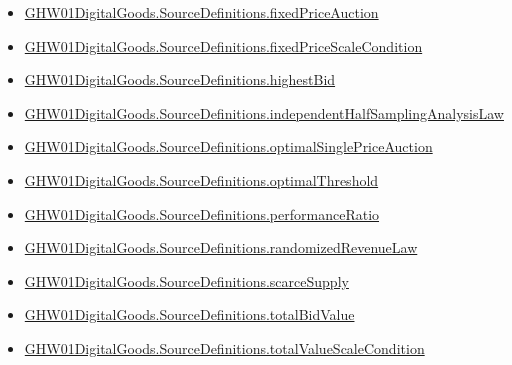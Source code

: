 \documentclass[10pt]{article}
\begin{document}
\begin{itemize}[leftmargin=1.2em]
\begin{itemize}[leftmargin=1.2em]
\item \hyperlink{paper-prerequisite-85852b14bf51130e}{GHW01\allowbreak{}Digital\allowbreak{}Goods.\allowbreak{}Source\allowbreak{}Definitions.\allowbreak{}fixed\allowbreak{}Price\allowbreak{}Auction}
\item \hyperlink{paper-prerequisite-cac1ad0b007c0092}{GHW01\allowbreak{}Digital\allowbreak{}Goods.\allowbreak{}Source\allowbreak{}Definitions.\allowbreak{}fixed\allowbreak{}Price\allowbreak{}Scale\allowbreak{}Condition}
\item \hyperlink{paper-prerequisite-702e37b431515e39}{GHW01\allowbreak{}Digital\allowbreak{}Goods.\allowbreak{}Source\allowbreak{}Definitions.\allowbreak{}highest\allowbreak{}Bid}
\item \hyperlink{paper-prerequisite-e6805388180d767a}{GHW01\allowbreak{}Digital\allowbreak{}Goods.\allowbreak{}Source\allowbreak{}Definitions.\allowbreak{}independent\allowbreak{}Half\allowbreak{}Sampling\allowbreak{}Analysis\allowbreak{}Law}
\item \hyperlink{paper-prerequisite-bde594f238fcbce3}{GHW01\allowbreak{}Digital\allowbreak{}Goods.\allowbreak{}Source\allowbreak{}Definitions.\allowbreak{}optimal\allowbreak{}Single\allowbreak{}Price\allowbreak{}Auction}
\item \hyperlink{paper-prerequisite-820d7331e38231bb}{GHW01\allowbreak{}Digital\allowbreak{}Goods.\allowbreak{}Source\allowbreak{}Definitions.\allowbreak{}optimal\allowbreak{}Threshold}
\item \hyperlink{paper-prerequisite-b207755505fee368}{GHW01\allowbreak{}Digital\allowbreak{}Goods.\allowbreak{}Source\allowbreak{}Definitions.\allowbreak{}performance\allowbreak{}Ratio}
\item \hyperlink{paper-prerequisite-7acfe252a6800193}{GHW01\allowbreak{}Digital\allowbreak{}Goods.\allowbreak{}Source\allowbreak{}Definitions.\allowbreak{}randomized\allowbreak{}Revenue\allowbreak{}Law}
\item \hyperlink{paper-prerequisite-cd946644fe3b40b8}{GHW01\allowbreak{}Digital\allowbreak{}Goods.\allowbreak{}Source\allowbreak{}Definitions.\allowbreak{}scarce\allowbreak{}Supply}
\item \hyperlink{paper-prerequisite-65b87e7e3704ad24}{GHW01\allowbreak{}Digital\allowbreak{}Goods.\allowbreak{}Source\allowbreak{}Definitions.\allowbreak{}total\allowbreak{}Bid\allowbreak{}Value}
\item \hyperlink{paper-prerequisite-7e98fae0fda55be2}{GHW01\allowbreak{}Digital\allowbreak{}Goods.\allowbreak{}Source\allowbreak{}Definitions.\allowbreak{}total\allowbreak{}Value\allowbreak{}Scale\allowbreak{}Condition}

\end{itemize}
\end{itemize}
\end{document}

